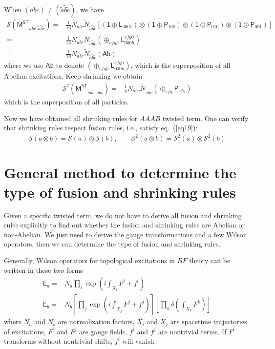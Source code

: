 \documentclass[11pt,nofootinbib,preprint]{revtex4-1}
\begin{document}
When $\left(abc\right)\ne\left(\tilde{a}\tilde{b}\tilde{c}\right)$, we have
\begin{align}
	\mathcal{S} \left( \mathsf{M^{ST}}_{abc,\tilde{a}\tilde{b}\tilde{c}} \right) =&\frac{1}{16}N_{abc}\tilde{N}_{\tilde{a}\tilde{b}\tilde{c}}\left[ \left( \mathsf{1}\oplus \mathsf{L}_{0001} \right) \otimes \left( \mathsf{1}\oplus \mathsf{P}_{100} \right) \otimes \left( \mathsf{1}\oplus \mathsf{P}_{010} \right) \otimes \left( \mathsf{1}\oplus \mathsf{P}_{001} \right) \right] \nonumber
	\\
	=&\frac{1}{16}N_{abc}\tilde{N}_{\tilde{a}\tilde{b}\tilde{c}}\left( \oplus _{efgh}\mathsf{L}_{000h}^{efg0} \right) \nonumber
	\\
	=&\frac{1}{16}N_{abc}\tilde{N}_{\tilde{a}\tilde{b}\tilde{c}}\left( \mathsf{Ab} \right)  
\end{align}
where we use $\mathsf{Ab}$ to denote $\left( \oplus _{efgh}\mathsf{L}_{000h}^{efg0} \right)$, which is the superposition of all Abelian excitations. Keep shrinking we obtain 
\begin{align}
	\mathcal{S} ^2\left( \mathsf{M^{ST}}_{abc,\tilde{a}\tilde{b}\tilde{c}} \right) =&\frac{1}{8}N_{abc}\tilde{N}_{\tilde{a}\tilde{b}\tilde{c}}\left( \oplus _{efg}\mathsf{P}_{efg} \right)
\end{align}
which is the superposition of all particles.

Now we have obtained all shrinking rules for $AAAB$ twisted term. One can verify that shrinking rules respect fusion rules, i.e., satisfy eq.~(\ref{eq19}):
\begin{align}
	\mathcal{S} \left( a\otimes b \right) =\mathcal{S} \left( a \right) \otimes \mathcal{S} \left( b \right), \qquad \mathcal{S}^2 \left( a\otimes b \right) =\mathcal{S}^2 \left( a \right) \otimes \mathcal{S}^2 \left( b \right)
\end{align}

\section{General method to determine the type of fusion and shrinking rules\label{ap2}}
Given a specific twisted term, we do not have to derive all fusion and shrinking rules explicitly to find out whether the fusion and shrinking rules are Abelian or non-Abelian. We just need to derive the gauge transformations and a few Wilson operators, then we can determine the type of fusion and shrinking rules.

Generally, Wilson operators for topological excitations in $BF$ theory can be written in these two forms 
\begin{align}
	\mathsf{E}_a=&N_a\prod_i{\exp \left( i\int_{X _i}{F^i+f^i} \right)} \label{eq1ap2}
	\\
	\mathsf{E}_b=&N_b\left[ \prod_j{\exp \left( i\int_{X _j}{F^j+f^j} \right)} \right] \left[ \prod_k{\delta \left( \int_{X _k}{F^k} \right)} \right]  \label{eq2ap2}
\end{align}
where $N_a$ and $N_b$ are normalization factors, $X _i$ and $X _j$ are spacetime trajectories of excitations, $F^i$ and $F^j$ are gauge fields, $f^i$ and $f^j$ are nontrivial terms. If $F^i$ transforms without nontrivial shifts, $f^i$ will vanish. 
\end{document}
